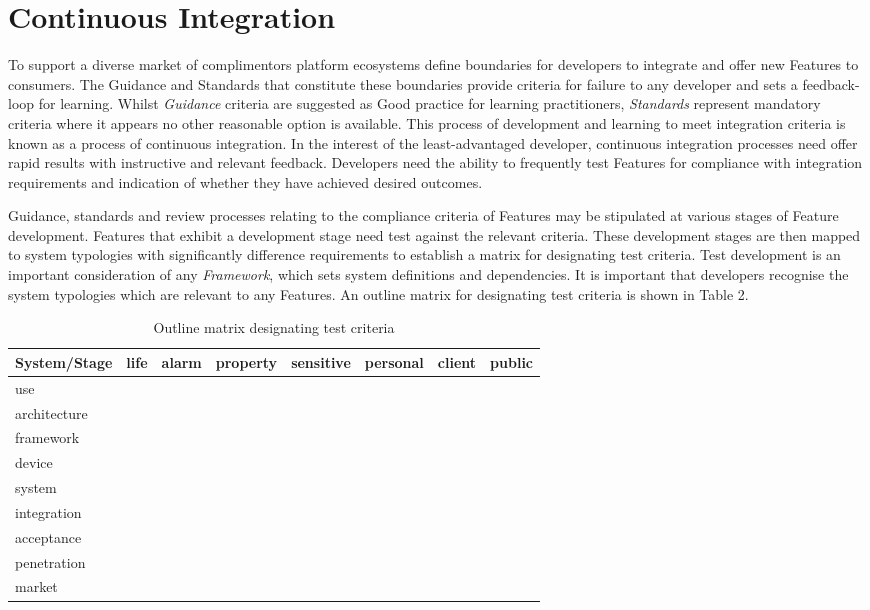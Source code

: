 \documentclass[11pt, oneside]{article}   	%
\begin{document}
\section{Continuous Integration}
To support a diverse market of complimentors platform ecosystems define boundaries for developers to integrate and offer new Features to consumers.
The Guidance and Standards that constitute these boundaries provide criteria for failure to any developer and sets a feedback-loop for learning.
Whilst \emph{Guidance} criteria are suggested as Good practice for learning practitioners, \emph{Standards} represent mandatory criteria where it appears no other reasonable option is available.
This process of development and learning to meet integration criteria is known as a process of continuous integration.
In the interest of the least-advantaged developer, continuous integration processes need offer rapid results with instructive and relevant feedback.
Developers need the ability to frequently test Features for compliance with integration requirements and indication of whether they have achieved desired outcomes.\

Guidance, standards and review processes relating to the compliance criteria of Features may be stipulated at various stages of Feature development.
Features that exhibit a development stage need test against the relevant criteria.
These development stages are then mapped to system typologies with significantly difference requirements to establish a matrix for designating test criteria.
Test development is an important consideration of any \emph{Framework}, which sets system definitions and dependencies.
It is important that developers recognise the system typologies which are relevant to any Features.
An outline matrix for designating test criteria is shown in Table 2.

\begin{table}[h]
\caption{Outline matrix designating test criteria}
\begin{center}
\begin{tabular}{| l | c | c | c | c | c | c | c |}
\hline
System/Stage&life&alarm&property&sensitive&personal&client&public\\
\hline
use&&&&&&&\\
architecture&&&&&&&\\
framework&&&&&&&\\
device&&&&&&&\\
system&&&&&&&\\
integration&&&&&&&\\
acceptance&&&&&&&\\
penetration&&&&&&&\\
market&&&&&&&\\
\hline
\end{tabular}
\end{center}
\label{Social contributions table}
\end{table}
\end{document}
